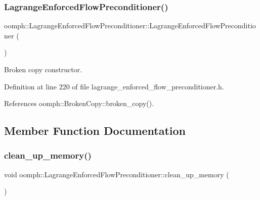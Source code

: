 \subsubsection{\texorpdfstring{Lagrange\+Enforced\+Flow\+Preconditioner()}{LagrangeEnforcedFlowPreconditioner()}\hspace{0.1cm}{\footnotesize\ttfamily [2/2]}}
{\footnotesize\ttfamily oomph\+::\+Lagrange\+Enforced\+Flow\+Preconditioner\+::\+Lagrange\+Enforced\+Flow\+Preconditioner (\begin{DoxyParamCaption}\item[{const \hyperlink{classoomph_1_1LagrangeEnforcedFlowPreconditioner}{Lagrange\+Enforced\+Flow\+Preconditioner} \&}]{ }\end{DoxyParamCaption})\hspace{0.3cm}{\ttfamily [inline]}}



Broken copy constructor. 



Definition at line 220 of file lagrange\+\_\+enforced\+\_\+flow\+\_\+preconditioner.\+h.



References oomph\+::\+Broken\+Copy\+::broken\+\_\+copy().



\subsection{Member Function Documentation}
\mbox{\label{classoomph_1_1LagrangeEnforcedFlowPreconditioner_ace8141de668eb2a172ef9a25c932134a}} 
\subsubsection{\texorpdfstring{clean\+\_\+up\+\_\+memory()}{clean\_up\_memory()}}
{\footnotesize\ttfamily void oomph\+::\+Lagrange\+Enforced\+Flow\+Preconditioner\+::clean\+\_\+up\+\_\+memory (\begin{DoxyParamCaption}{ }\end{DoxyParamCaption})\hspace{0.3cm}{\ttfamily [virtual]}}



